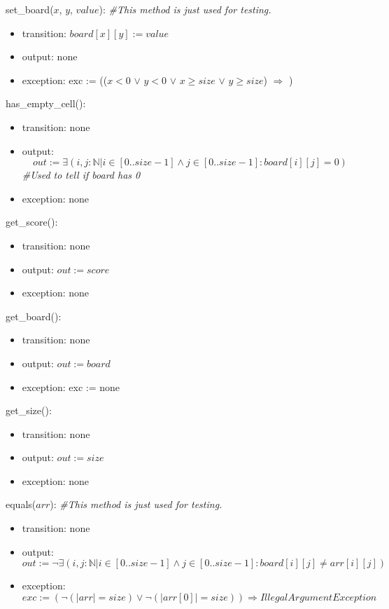 \documentclass[12pt]{article}
\begin{document}
\noindent set\_board($\mathit{x}$, $\mathit{y}$, $\mathit{value}$):
\textit{\#This method is just used for testing.}
\begin{itemize}
\item transition:
$\mathit{board}[x][y] := value$
\item output: none
\item exception: exc := (($\mathit{x} < 0$ $\lor$ $\mathit{y} < 0$ $\lor$ $\mathit{x} \geq \mathit{size}$ $\lor$ $\mathit{y} \geq \mathit{size}$) $\Rightarrow$ )
\end{itemize}

\noindent has\_empty\_cell():
\begin{itemize}
\item transition: none
\item output: 
 $$out := \exists(i, j: \mathbb{N} | i \in [0..\mathit{size}-1] \land j \in [0..\mathit{size}-1] : \mathit{board}[i][j] = 0)$$\textit{\#Used to tell if board has 0}
\item exception: none
\end{itemize}

\noindent get\_score():
\begin{itemize}
\item transition: none
\item output: $\mathit{out} := \mathit{score}$
\item exception: none
\end{itemize}

\noindent get\_board():
\begin{itemize}
\item transition: none
\item output: $\mathit{out} := \mathit{board}$
\item exception: exc := none
\end{itemize}

\noindent get\_size():
\begin{itemize}
\item transition: none
\item output: $\mathit{out} := \mathit{size}$
\item exception: none
\end{itemize}

\noindent equals($\mathit{arr}$):
\textit{\#This method is just used for testing.}
\begin{itemize}
\item transition: none
\item output:$\mathit{out} := \lnot \exists (i, j : \mathbb{N} | i \in [0..\mathit{size}-1] \land j \in [0..\mathit{size}-1] : \mathit{board}[i][j] \neq \mathit{arr}[i][j])$
\item exception: $exc := ( \lnot (|arr| = \mathit{size}) \lor \lnot(|arr[0]| = \mathit{size})) \Rightarrow IllegalArgumentException$
\end{itemize}
\end{document}
